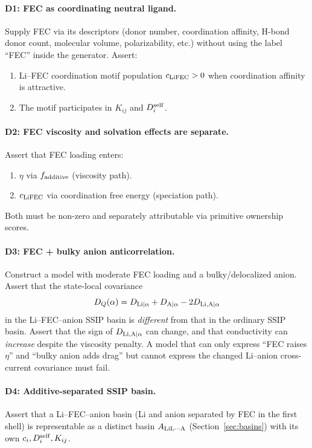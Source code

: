 \documentclass[11pt]{article}
\begin{document}
\paragraph{D1: FEC as coordinating neutral ligand.}
Supply FEC via its descriptors (donor number, coordination affinity,
H-bond donor count, molecular volume, polarizability, etc.) without
using the label ``FEC'' inside the generator. Assert:
\begin{enumerate}
\item Li--FEC coordination motif population \(c_{\rm LiFEC}>0\) when
coordination affinity is attractive.
\item The motif participates in \(K_{ij}\) and \(D_i^{\rm self}\).
\end{enumerate}

\paragraph{D2: FEC viscosity and solvation effects are separate.}
Assert that FEC loading enters:
\begin{enumerate}
\item \(\eta\) via \(f_{\rm additive}\) (viscosity path).
\item \(c_{\rm LiFEC}\) via coordination free energy (speciation path).
\end{enumerate}
Both must be non-zero and separately attributable via primitive ownership scores.

\paragraph{D3: FEC + bulky anion anticorrelation.}
Construct a model with moderate FEC loading and a bulky/delocalized anion.
Assert that the state-local covariance
\[
D_Q(\alpha)
=
D_{{\rm Li}|\alpha}+D_{{\rm A}|\alpha}-2D_{{\rm Li,A}|\alpha}
\]
in the Li--FEC--anion SSIP basin is \emph{different} from that in the
ordinary SSIP basin. Assert that the sign of \(D_{{\rm Li,A}|\alpha}\) can
change, and that conductivity can \emph{increase} despite the viscosity penalty.
A model that can only express ``FEC raises \(\eta\)'' and ``bulky anion adds drag''
but cannot express the changed Li--anion cross-current covariance must fail.

\paragraph{D4: Additive-separated SSIP basin.}
Assert that a Li--FEC--anion basin (Li and anion separated by FEC in the
first shell) is representable as a distinct basin \(A_{\rm LiL\cdots A}\)
(Section~\ref{sec:basins}) with its own \(c_i,D_i^{\rm self},K_{ij}\).
\end{document}
